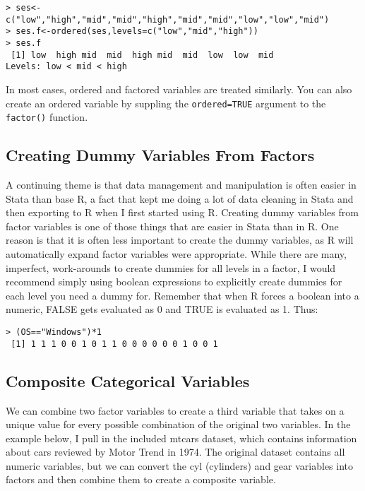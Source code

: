 \documentclass[12pt, oneside]{amsart}   	%
\begin{document}
\begin{verbatim}
> ses<-c("low","high","mid","mid","high","mid","mid","low","low","mid")
> ses.f<-ordered(ses,levels=c("low","mid","high"))
> ses.f
 [1] low  high mid  mid  high mid  mid  low  low  mid 
Levels: low < mid < high
\end{verbatim}

In most cases, ordered and factored variables are treated similarly. You can also create an ordered variable by suppling the \texttt{ordered=TRUE} argument to the \texttt{factor()} function.

\subsection{Creating Dummy Variables From Factors}

A continuing theme is that data management and manipulation is often easier in Stata than base R, a fact that kept me doing a lot of data cleaning in Stata and then exporting to R when I first started using R. Creating dummy variables from factor variables is one of those things that are easier in Stata than in R. One reason is that it is often less important to create the dummy variables, as R will automatically expand factor variables were appropriate. While there are many, imperfect, work-arounds to create dummies for all levels in a factor, I would recommend simply using boolean expressions to explicitly create dummies for each level you need a dummy for. Remember that when R forces a boolean into a numeric, FALSE gets evaluated as 0 and TRUE is evaluated as 1. Thus:

\begin{verbatim}
> (OS=="Windows")*1
 [1] 1 1 1 0 0 1 0 1 1 0 0 0 0 0 0 1 0 0 1
\end{verbatim}

\subsection{Composite Categorical Variables}

We can combine two factor variables to create a third variable that takes on a unique value for every possible combination of the original two variables. In the example below, I pull in the included mtcars dataset, which contains information about cars reviewed by Motor Trend in 1974. The original dataset contains all numeric variables, but we can convert the cyl (cylinders) and gear variables into factors and then combine them to create a composite variable.
\end{document}
